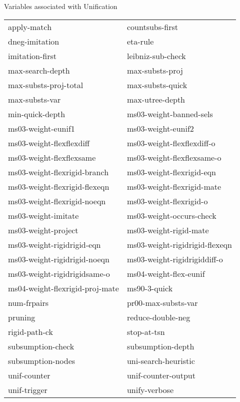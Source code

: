 \begin{description} 
\item[UNIFICATION]  
Variables associated with Unification

\begin{tabular}{l l}
apply-match&countsubs-first\\
dneg-imitation&eta-rule\\
imitation-first&leibniz-sub-check\\
max-search-depth&max-substs-proj\\
max-substs-proj-total&max-substs-quick\\
max-substs-var&max-utree-depth\\
min-quick-depth&ms03-weight-banned-sels\\
ms03-weight-eunif1&ms03-weight-eunif2\\
ms03-weight-flexflexdiff&ms03-weight-flexflexdiff-o\\
ms03-weight-flexflexsame&ms03-weight-flexflexsame-o\\
ms03-weight-flexrigid-branch&ms03-weight-flexrigid-eqn\\
ms03-weight-flexrigid-flexeqn&ms03-weight-flexrigid-mate\\
ms03-weight-flexrigid-noeqn&ms03-weight-flexrigid-o\\
ms03-weight-imitate&ms03-weight-occurs-check\\
ms03-weight-project&ms03-weight-rigid-mate\\
ms03-weight-rigidrigid-eqn&ms03-weight-rigidrigid-flexeqn\\
ms03-weight-rigidrigid-noeqn&ms03-weight-rigidrigiddiff-o\\
ms03-weight-rigidrigidsame-o&ms04-weight-flex-eunif\\
ms04-weight-flexrigid-proj-mate&ms90-3-quick\\
num-frpairs&pr00-max-substs-var\\
pruning&reduce-double-neg\\
rigid-path-ck&stop-at-tsn\\
subsumption-check&subsumption-depth\\
subsumption-nodes&uni-search-heuristic\\
unif-counter&unif-counter-output\\
unif-trigger&unify-verbose\\
\end{tabular}
\item
\end{description}

